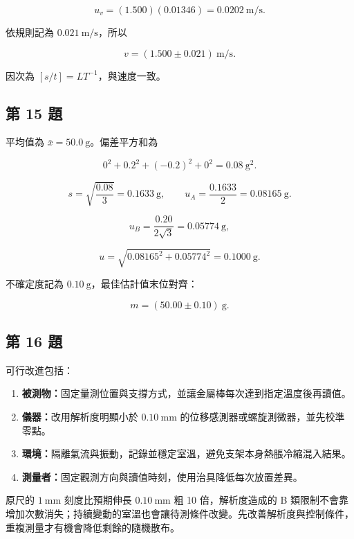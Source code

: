 \documentclass[11pt,a4paper]{article}
\providecommand{\tightlist}{%
  \setlength{\itemsep}{0pt}\setlength{\parskip}{0pt}}
\begin{document}
\[
u_v=(1.500)(0.01346)=0.0202\ \mathrm{m/s}.
\]

依規則記為 \(0.021\ \mathrm{m/s}\)，所以

\[
\boxed{v=(1.500\pm0.021)\ \mathrm{m/s}}.
\]

因次為 \([s/t]=LT^{-1}\)，與速度一致。

\subsection{第 15 題}\label{ux7b2c-15-ux984c}

平均值為 \(\bar x=50.0\ \mathrm{g}\)。偏差平方和為

\[
0^2+0.2^2+(-0.2)^2+0^2=0.08\ \mathrm{g^2}.
\]

\[
s=\sqrt{\frac{0.08}{3}}=0.1633\ \mathrm{g},\qquad
u_A=\frac{0.1633}{2}=0.08165\ \mathrm{g}.
\]

\[
u_B=\frac{0.20}{2\sqrt3}=0.05774\ \mathrm{g},
\]

\[
u=\sqrt{0.08165^2+0.05774^2}=0.1000\ \mathrm{g}.
\]

不確定度記為 \(0.10\ \mathrm{g}\)，最佳估計值末位對齊：

\[
\boxed{m=(50.00\pm0.10)\ \mathrm{g}}.
\]

\subsection{第 16 題}\label{ux7b2c-16-ux984c}

可行改進包括：

\begin{enumerate}
\def\labelenumi{\arabic{enumi}.}
\tightlist
\item
  \textbf{被測物：}固定量測位置與支撐方式，並讓金屬棒每次達到指定溫度後再讀值。
\item
  \textbf{儀器：}改用解析度明顯小於 \(0.10\ \mathrm{mm}\) 的位移感測器或螺旋測微器，並先校準零點。
\item
  \textbf{環境：}隔離氣流與振動，記錄並穩定室溫，避免支架本身熱脹冷縮混入結果。
\item
  \textbf{測量者：}固定觀測方向與讀值時刻，使用治具降低每次放置差異。
\end{enumerate}

原尺的 \(1\ \mathrm{mm}\) 刻度比預期伸長 \(0.10\ \mathrm{mm}\) 粗 10 倍，解析度造成的 B 類限制不會靠增加次數消失；持續變動的室溫也會讓待測條件改變。先改善解析度與控制條件，重複測量才有機會降低剩餘的隨機散布。
\end{document}
